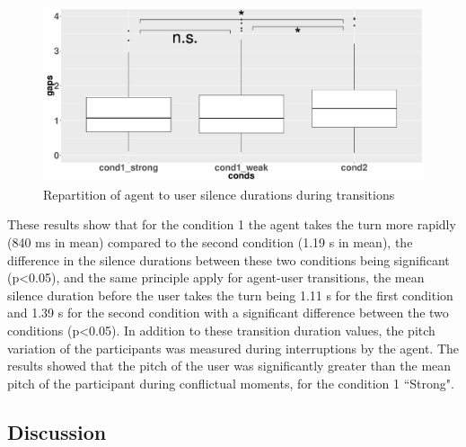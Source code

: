 \begin{figure}
\centering
\includegraphics[width=\linewidth]{figure/boxTransitionsAU.pdf}
\caption{Repartition of agent to user silence durations during transitions}
\label{box_au}
\end{figure}

These results show that for the condition 1 the agent takes the turn more rapidly (840 ms in mean) compared to the second condition (1.19 s in mean), the difference in the silence durations between these two conditions being significant (p<0.05), and the same principle apply for agent-user transitions, the mean silence duration before the user takes the turn being 1.11 s for the first condition and 1.39 s for the second condition with a significant difference between the two conditions (p<0.05). 
In addition to these transition duration values, the pitch variation of the participants was measured during interruptions by the agent. The results showed that the pitch of the user was significantly greater than the mean pitch of the participant during conflictual moments, for the condition 1 ``Strong".



\subsection{Discussion}


